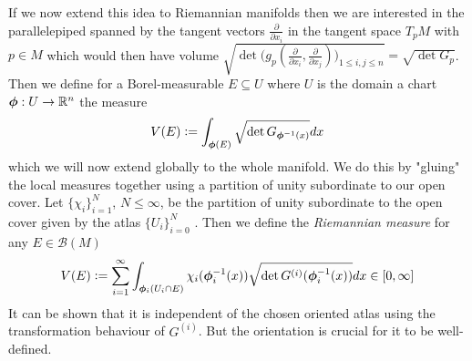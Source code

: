 \documentclass[../main.tex]{subfiles}
\begin{document}
If we now extend this idea to Riemannian manifolds then we are interested 
in the parallelepiped spanned by the tangent vectors $\frac{\partial}{\partial x_i}$
in the tangent space $T_p M$ with $p \in M$
which would then have volume $ \sqrt{\det \big( g_p(\frac{\partial}{\partial x_i}, 
\frac{\partial}{\partial x_j}) \big)_{1\leq i,j \leq n} } = 
\sqrt{ \det G_p }$. Then we define for a Borel-measurable $E \subseteq U$ where $U$ is 
the domain a chart $\boldsymbol{\phi}: U \rightarrow \mathbb{R}^n$ the measure 
\begin{align*}
    V(E) \vcentcolon= \int_{\boldsymbol{\phi}(E)} \sqrt{ \det G_{\boldsymbol{\phi}^{-1}(x)}} dx 
\end{align*} 
which we will now extend globally to the whole manifold. We do this 
by "gluing" the local measures together using a partition of unity subordinate 
to our open cover. 
Let $\{ \chi_i \}_{i=1}^N$, $N \leq \infty$, be the partition of unity 
subordinate to the open cover given by the atlas $\{U_i\}_{i = 0}^N$ . Then we define the 
\textit{Riemannian measure} for any $E \in \mathcal{B}(M)$
\begin{align}
    V(E) \vcentcolon= \sum\limits_{i=1}^\infty \int_{\boldsymbol{\phi}_i(U_i \cap E)}
        \chi_i(\boldsymbol{\phi}_i^{-1}(x)) \sqrt{\det G^{(i)}(\boldsymbol{\phi}_i^{-1}(x))} dx 
        \in [0,\infty] \label{eq:riemannian_measure}
\end{align}
It can be shown that it is independent of the chosen oriented atlas 
using the transformation behaviour of $G^{(i)}$. But the orientation is 
crucial for it to be well-defined. 
\end{document}

